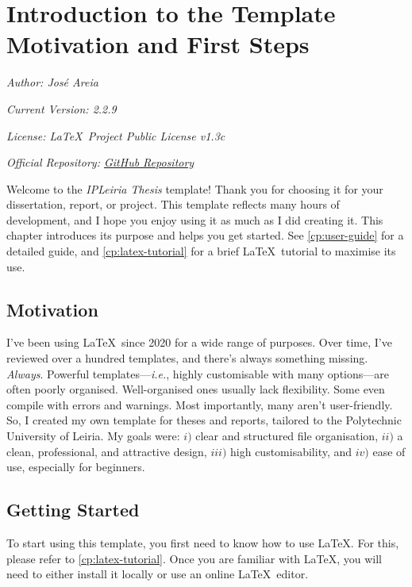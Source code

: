 \chapter[Introduction to the Template: Motivation and First Steps]{Introduction to the Template Motivation and First Steps}
\label{cp:introduction}

{
\parindent0pt

\textit{Author: José Areia}

\textit{Current Version: 2.2.9}

\textit{License: \LaTeX~Project Public License v1.3c}

\textit{Official Repository: \href{https://github.com/joseareia/ipleiria-thesis}{GitHub Repository}}

\vspace{.935em}

Welcome to the \textcolor{maincolor}{\textit{IPLeiria Thesis}} template! Thank you for choosing it for your dissertation, report, or project. This template reflects many hours of development, and I hope you enjoy using it as much as I did creating it. This chapter introduces its purpose and helps you get started. See \autoref{cp:user-guide} for a detailed guide, and \autoref{cp:latex-tutorial} for a brief \LaTeX~tutorial to maximise its use.
}

\section{Motivation}
I've been using \LaTeX~since 2020 for a wide range of purposes. Over time, I've reviewed over a hundred templates, and there's always something missing. \textit{Always}. Powerful templates---\textit{i.e.}, highly customisable with many options---are often poorly organised. Well-organised ones usually lack flexibility. Some even compile with errors and warnings. Most importantly, many aren't user-friendly. So, I created my own template for theses and reports, tailored to the Polytechnic University of Leiria. My goals were: \(i)\) clear and structured file organisation, \(ii)\) a clean, professional, and attractive design, \(iii)\) high customisability, and \(iv)\) ease of use, especially for beginners.


\section{Getting Started}
To start using this template, you first need to know how to use \LaTeX. For this, please refer to \autoref{cp:latex-tutorial}. Once you are familiar with \LaTeX, you will need to either install it locally or use an online \LaTeX~editor.

